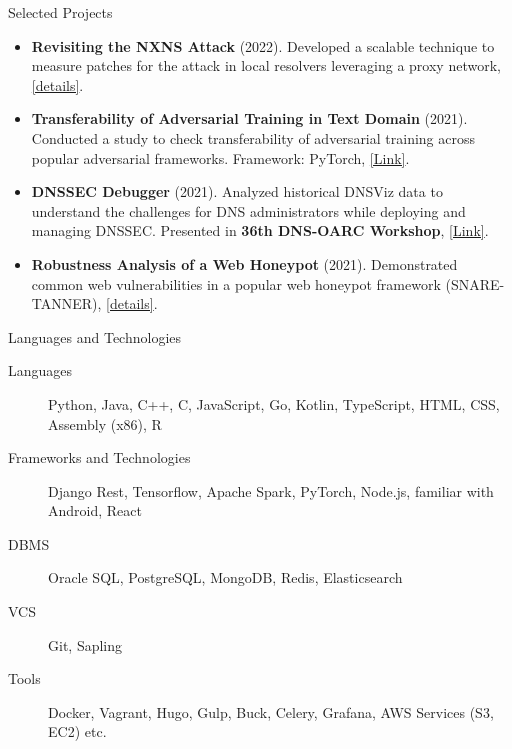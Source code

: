 \documentclass[]{mcdowellcv}
\begin{document}
	\begin{cvsection}{Selected Projects}
		\begin{cvsubsection}{}{}{}
			\begin{itemize}
				\item \textbf{Revisiting the NXNS Attack} (2022). Developed a scalable technique to measure patches for the attack in local resolvers leveraging a proxy network, \href{https://drive.google.com/file/d/1kuTSIHuNUYxmIKbR6MsSg3znMqx55mCP/view}{[details]}.
				\item \textbf{Transferability of Adversarial Training in Text Domain} (2021). Conducted a study to check transferability of adversarial training across popular adversarial frameworks. Framework: PyTorch, \href{https://github.com/Ashiq5/AdvTrainingExperiment}{[Link]}.
				\item \textbf{DNSSEC Debugger} (2021). Analyzed historical DNSViz data to understand the challenges for DNS administrators while deploying and managing DNSSEC. Presented in \textbf{36th DNS-OARC Workshop}, \href{https://indico.dns-oarc.net/event/40/contributions/891/attachments/857/1555/DNS-OARC-final.pdf}{[Link]}.
				\item \textbf{Robustness Analysis of a Web Honeypot} (2021). Demonstrated common web vulnerabilities in a popular web honeypot framework (SNARE-TANNER), \href{https://drive.google.com/file/d/1-FuDy-8xTE2TCRVV2RDuusnhAiLdgMeO/view?usp=sharing}{[details]}.
			\end{itemize}
		\end{cvsubsection}
	\end{cvsection}

	\begin{cvsection}{Languages and Technologies}
		\begin{cvsubsection}{}{}{}
			\begin{description}
				\item[Languages] Python, Java, C++, C, JavaScript, Go, Kotlin, TypeScript, HTML, CSS, Assembly (x86), R
				\item[Frameworks and Technologies] Django Rest, Tensorflow, Apache Spark, PyTorch, Node.js, familiar with Android, React
				\item[DBMS] Oracle SQL, PostgreSQL, MongoDB, Redis, Elasticsearch
				\item[VCS] Git, Sapling
				\item[Tools] Docker, Vagrant, Hugo, Gulp, Buck, Celery, Grafana, AWS Services (S3, EC2) etc. %
			\end{description}
		\end{cvsubsection}
	\end{cvsection}
\end{document}
